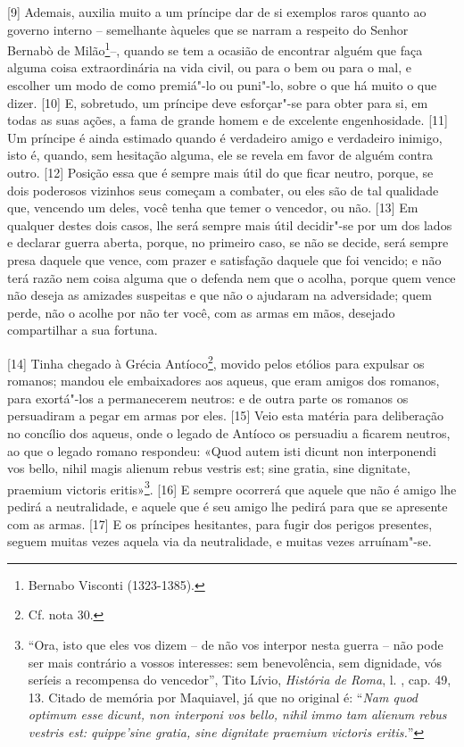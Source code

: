 {[}9{]} Ademais, auxilia muito a um príncipe dar de si exemplos raros
quanto ao governo interno -- semelhante àqueles que se narram a respeito
do Senhor Bernabò de Milão\footnote{Bernabo Visconti (1323-1385).}--,
quando se tem a ocasião de encontrar alguém que faça alguma coisa
extraordinária na vida civil, ou para o bem ou para o mal, e escolher um
modo de como premiá"-lo ou puni"-lo, sobre o que há muito o que dizer.
{[}10{]} E, sobretudo, um príncipe deve esforçar"-se para obter para si,
em todas as suas ações, a fama de grande homem e de excelente
engenhosidade.
{[}11{]} Um príncipe é ainda estimado quando é verdadeiro amigo e
verdadeiro inimigo, isto é, quando, sem hesitação alguma, ele se revela
em favor de alguém contra outro. {[}12{]} Posição essa que é sempre mais
útil do que ficar neutro, porque, se dois poderosos vizinhos seus
começam a combater, ou eles são de tal qualidade que, vencendo um deles,
você tenha que temer o vencedor, ou não. {[}13{]} Em qualquer destes
dois casos, lhe será sempre mais útil decidir"-se por um dos lados e
declarar guerra aberta, porque, no primeiro caso, se não se decide, será
sempre presa daquele que vence, com prazer e satisfação daquele que foi
vencido; e não terá razão nem coisa alguma que o defenda nem que o
acolha, porque quem vence não deseja as amizades suspeitas e que não o
ajudaram na adversidade; quem perde, não o acolhe por não ter você, com
as armas em mãos, desejado compartilhar a sua fortuna.

{[}14{]} Tinha chegado à Grécia Antíoco\footnote{Cf. nota 30.}, movido
pelos etólios para expulsar os romanos; mandou ele embaixadores aos
aqueus, que eram amigos dos romanos, para exortá"-los a permanecerem
neutros: e de outra parte os romanos os persuadiram a pegar em armas por
eles. {[}15{]} Veio esta matéria para deliberação no concílio dos
aqueus, onde o legado de Antíoco os persuadiu a ficarem neutros, ao que
o legado romano respondeu: «Quod autem isti dicunt non interponendi vos
bello, nihil magis alienum rebus vestris est; sine gratia, sine
dignitate, praemium victoris eritis»\footnote{``Ora, isto que eles vos
  dizem -- de não vos interpor nesta guerra -- não pode ser mais
  contrário a vossos interesses: sem benevolência, sem dignidade, vós
  seríeis a recompensa do vencedor'', Tito Lívio, \emph{História de
  Roma}, l. , cap. 49, 13. Citado de memória por Maquiavel, já que
  no original é: ``\emph{Nam quod optimum esse dicunt, non interponi vos
  bello, nihil immo tam alienum rebus vestris est: quippe'sine gratia,
  sine dignitate praemium victoris eritis.}''}. {[}16{]} E sempre
ocorrerá que aquele que não é amigo lhe pedirá a neutralidade, e aquele
que é seu amigo lhe pedirá para que se apresente com as armas. {[}17{]}
E os príncipes hesitantes, para fugir dos perigos presentes, seguem
muitas vezes aquela via da neutralidade, e muitas vezes arruínam"-se.

